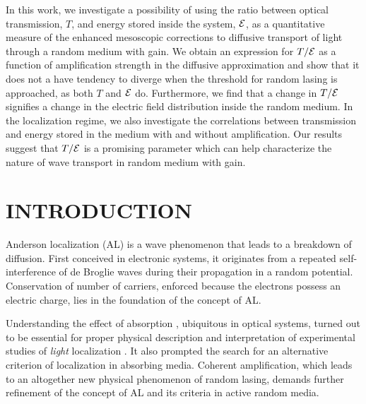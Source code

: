 In this work, we investigate a possibility of using the ratio between optical transmission, $T$, and energy stored inside the system, ${\cal E}$, as a quantitative measure of the enhanced mesoscopic corrections to diffusive transport of light through a random medium with gain. We obtain an expression for $T/{\cal E}$ as a function of amplification strength in the diffusive approximation and show that it does not a have tendency to diverge when the threshold for random lasing is approached, as both $T$ and ${\cal E}$ do. Furthermore, we find that a change in $T/{\cal E}$ signifies a change in the electric field distribution inside the random medium. In the localization regime, we also investigate the correlations between transmission and energy stored in the medium with and without amplification. Our results suggest that $T/{\cal E}$ is a promising parameter which can help characterize the nature of wave transport in random medium with gain.


\section{INTRODUCTION}
\label{sec:intro}

Anderson localization \cite{1958_Anderson} (AL) is a wave phenomenon \cite{1960_Ioffe_criterion,1984_John_prl,1985_Anderson} that leads to a breakdown of diffusion\cite{1980_Vollhardt_Wolfle,1991_Altshuler}. First conceived in electronic systems, it originates from  a repeated self-interference of de Broglie waves during their propagation in a random potential. Conservation of number of carriers, enforced because the electrons possess an electric charge, lies in the foundation of the concept of AL. 

Understanding the effect of absorption \cite{1984_John_prl}, ubiquitous in optical systems, turned out to be essential for proper physical description and interpretation of experimental studies of {\it light} localization \cite{1989_Genack,1997_wiersma_nature,1999_Maret,2000_chabanov_nature,2007_Maret,2007_Segev}. It also prompted the search\cite{2000_chabanov_nature} for an alternative criterion of localization in absorbing media. Coherent amplification, which leads to an altogether new physical phenomenon of random lasing\cite{2005_Cao}, demands further refinement of the concept of AL and its criteria in active random media.

